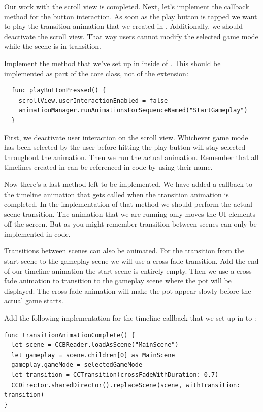 Our work with the scroll view is completed. Next, let's implement the callback
method for the button interaction. As soon as the play button is tapped we want
to play the transition animation that we created in \SB{}. Additionally, we
should deactivate the scroll view. That way users cannot modify the selected
game mode while the scene is in transition.

\begin{leftbar}
Implement the  method that we've set up in \SB{}
inside of . This should be implemented as part of the
core class, not of the extension:
\begin{lstlisting}
  func playButtonPressed() {
    scrollView.userInteractionEnabled = false
    animationManager.runAnimationsForSequenceNamed("StartGameplay")
  }
\end{lstlisting}
\end{leftbar}
First, we deactivate user interaction on the scroll view. Whichever game mode
has been selected by the user before hitting the play button will stay selected
throughout the animation. Then we run the actual animation. Remember that all
timelines created in \SB{} can be referenced in code by using their name.

Now there's a last method left to be implemented. We have added a callback to
the timeline animation that gets called when the transition animation is
completed. In the implementation of that method we should perform the actual
scene transition. The animation that we are running only moves the UI elements
off the screen. But as you might remember transition between scenes can only be
implemented in code. 

Transitions between scenes can also be animated. For the
transition from the start scene to the gameplay scene we will use a cross fade
transition. Add the end of our timeline animation the start scene is entirely
empty. Then we use a cross fade animation to transition to the gameplay scene
where the pot will be displayed. The cross fade animation will make the pot
appear slowly before the actual game starts.

\begin{leftbar}
Add the following implementation for the timeline callback that we set up in
\SB{} to :
\begin{lstlisting}
func transitionAnimationComplete() {
  let scene = CCBReader.loadAsScene("MainScene")
  let gameplay = scene.children[0] as MainScene
  gameplay.gameMode = selectedGameMode
  let transition = CCTransition(crossFadeWithDuration: 0.7)
  CCDirector.sharedDirector().replaceScene(scene, withTransition: transition)
}
\end{lstlisting}
\end{leftbar}

